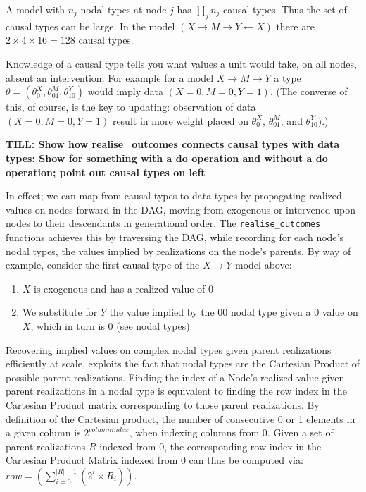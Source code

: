 \documentclass[
  11pt,
  article]{jss}
\providecommand{\tightlist}{%
  \setlength{\itemsep}{0pt}\setlength{\parskip}{0pt}}\usepackage{longtable,booktabs,array}
\begin{document}
A model with \(n_j\) nodal types at node \(j\) has \(\prod_jn_j\) causal
types. Thus the set of causal types can be large. In the model
\((X\rightarrow M \rightarrow Y \leftarrow X)\) there are
\(2\times 4\times 16 = 128\) causal types.

Knowledge of a causal type tells you what values a unit would take, on
all nodes, absent an intervention. For example for a model
\(X \rightarrow M \rightarrow Y\) a type
\(\theta = (\theta^X_0, \theta^M_{01}, \theta^Y_{10})\) would imply data
\((X=0, M=0, Y=1)\). (The converse of this, of course, is the key to
updating: observation of data \((X=0, M=0, Y=1)\) result in more weight
placed on \(\theta^X_0\), \(\theta^M_{01}\), and \(\theta^Y_{10})\).)

\textbf{TILL: Show how realise\_outcomes connects causal types with data
types: Show for something with a do operation and without a do
operation; point out causal types on left}

In effect; we can map from causal types to data types by propagating
realized values on nodes forward in the DAG, moving from exogenous or
intervened upon nodes to their descendants in generational order. The
\texttt{realise\_outcomes} functions achieves this by traversing the
DAG, while recording for each node's nodal types, the values implied by
realizations on the node's parents. By way of example, consider the
first causal type of the \(X \rightarrow Y\) model above:

\begin{enumerate}
\def\labelenumi{\arabic{enumi}.}
\tightlist
\item
  \(X\) is exogenous and has a realized value of \(0\)
\item
  We substitute for \(Y\) the value implied by the \(00\) nodal type
  given a \(0\) value on \(X\), which in turn is \(0\) (see nodal types)
\end{enumerate}

Recovering implied values on complex nodal types given parent
realizations efficiently at scale, exploits the fact that nodal types
are the Cartesian Product of possible parent realizations. Finding the
index of a Node's realized value given parent realizations in a nodal
type is equivalent to finding the row index in the Cartesian Product
matrix corresponding to those parent realizations. By definition of the
Cartesian product, the number of consecutive 0 or 1 elements in a given
column is \(2^{columnindex}\), when indexing columns from 0. Given a set
of parent realizations \(R\) indexed from 0, the corresponding row index
in the Cartesian Product Matrix indexed from 0 can thus be computed via:
\(row = (\sum_{i = 0}^{|R| - 1} (2^{i} \times R_i))\).
\end{document}
